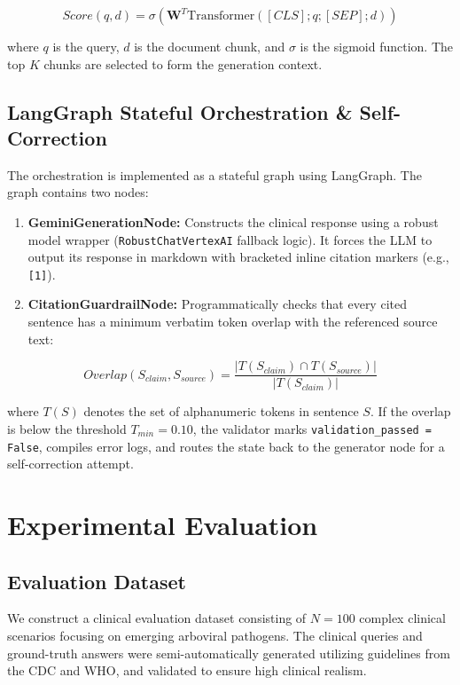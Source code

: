 \documentclass[sn-mathphys,Numbered]{sn-jnl}%
\begin{document}
\begin{equation}
Score(q, d) = \sigma(\mathbf{W}^T \text{Transformer}([CLS]; q; [SEP]; d))
\end{equation}

where $q$ is the query, $d$ is the document chunk, and $\sigma$ is the sigmoid function. The top $K$ chunks are selected to form the generation context.

\subsection{LangGraph Stateful Orchestration \& Self-Correction}
The orchestration is implemented as a stateful graph using LangGraph. The graph contains two nodes:
\begin{enumerate}
    \item \textbf{GeminiGenerationNode:} Constructs the clinical response using a robust model wrapper (\texttt{RobustChatVertexAI} fallback logic). It forces the LLM to output its response in markdown with bracketed inline citation markers (e.g., \texttt{[1]}).
    \item \textbf{CitationGuardrailNode:} Programmatically checks that every cited sentence has a minimum verbatim token overlap with the referenced source text:
\end{enumerate}

\begin{equation}
Overlap(S_{claim}, S_{source}) = \frac{|T(S_{claim}) \cap T(S_{source})|}{|T(S_{claim})|}
\end{equation}

where $T(S)$ denotes the set of alphanumeric tokens in sentence $S$. If the overlap is below the threshold $T_{min} = 0.10$, the validator marks \texttt{validation\_passed = False}, compiles error logs, and routes the state back to the generator node for a self-correction attempt.

\section{Experimental Evaluation}\label{sec3}

\subsection{Evaluation Dataset}
We construct a clinical evaluation dataset consisting of $N=100$ complex clinical scenarios focusing on emerging arboviral pathogens. The clinical queries and ground-truth answers were semi-automatically generated utilizing guidelines from the CDC and WHO, and validated to ensure high clinical realism. 
\end{document}
